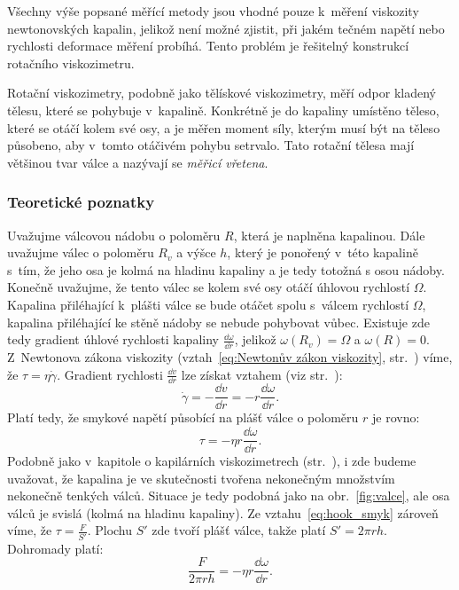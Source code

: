 \documentclass[12pt]{article}
\begin{document}
Všechny výše popsané měřící metody jsou vhodné pouze k~měření viskozity newtonovských kapalin, jelikož není možné zjistit, při jakém tečném napětí nebo rychlosti deformace měření probíhá. Tento problém je řešitelný konstrukcí rotačního viskozimetru.
\par\noindent
Rotační viskozimetry, podobně jako tělískové viskozimetry, měří odpor kladený tělesu, které se pohybuje v~kapalině. Konkrétně je do kapaliny umístěno těleso, které se otáčí kolem své osy, a je měřen moment síly, kterým musí být na těleso působeno, aby v~tomto otáčivém pohybu setrvalo. Tato rotační tělesa mají většinou tvar válce a nazývají se \emph{měřicí vřetena}.

\subsubsection{Teoretické poznatky}%

Uvažujme válcovou nádobu o poloměru $R$, která je naplněna kapalinou. Dále uvažujme válec o poloměru $R_v$ a výšce $h$, který je ponořený v~této kapalině s~tím, že jeho osa je kolmá na hladinu kapaliny a je tedy totožná s osou nádoby. Konečně uvažujme, že tento válec se kolem své osy otáčí úhlovou rychlostí $\Omega$. Kapalina přiléhající k~plášti válce se bude otáčet spolu s~válcem rychlostí $\Omega$, kapalina přiléhající ke stěně nádoby se nebude pohybovat vůbec. Existuje zde tedy gradient úhlové rychlosti kapaliny $\frac{\dd\omega}{\dd r}$, jelikož $\omega(R_v) = \Omega$ a $\omega(R) = 0$.\label{eq:Uhlova_rychlost} Z~Newtonova zákona viskozity (vztah~\ref{eq:Newtonův zákon viskozity}, str.~\pageref{eq:Newtonův zákon viskozity}) víme, že $\tau = \eta\dot\gamma$. Gradient rychlosti $\frac{\dd v}{\dd r}$ lze získat vztahem (viz str.~\pageref{eq:gamma_gradient}):
\begin{equation}
    \dot\gamma = -\frac{\dd v}{\dd r} = -r\frac{\dd\omega}{\dd r}\text{.}
\end{equation}
Platí tedy, že smykové napětí působící na plášť válce o poloměru $r$ je rovno:
\begin{equation}
    \tau = -\eta r\frac{\dd\omega}{\dd r}\text{.}
\end{equation}
Podobně jako v~kapitole o kapilárních viskozimetrech (str.~\pageref{eq:gamma_gradient}), i zde budeme uvažovat, že kapalina je ve skutečnosti tvořena nekonečným množstvím nekonečně tenkých válců. Situace je tedy podobná jako na obr.~\ref{fig:valce}, ale osa válců je svislá (kolmá na hladinu kapaliny).
Ze vztahu~\ref{eq:hook_smyk} zároveň víme, že $\tau = \frac{F}{S'}$. Plochu $S'$ zde tvoří plášť válce, takže platí $S' = 2\pi rh$. Dohromady platí:
\begin{equation}
    \frac{F}{2\pi rh} = -\eta r\frac{\dd\omega}{\dd r}\text{.}
\end{equation}
\end{document}
